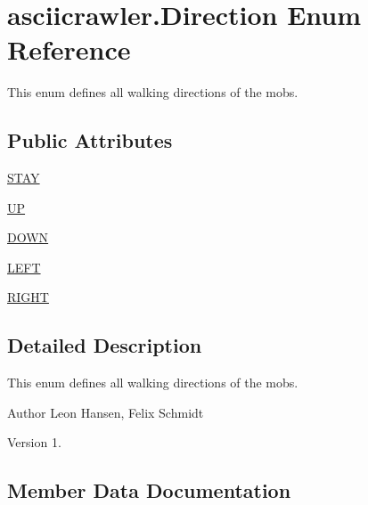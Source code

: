 \hypertarget{enumasciicrawler_1_1Direction}{}\section{asciicrawler.\+Direction Enum Reference}
\label{enumasciicrawler_1_1Direction}


This enum defines all walking directions of the mobs.  


\subsection*{Public Attributes}
\begin{DoxyCompactItemize}
\item 
\hyperlink{enumasciicrawler_1_1Direction_a78902531c0af93fb05af7223491a4a1f}{S\+T\+AY}
\item 
\hyperlink{enumasciicrawler_1_1Direction_a6ddc24b03c5e790038cb48cf48ed8bb0}{UP}
\item 
\hyperlink{enumasciicrawler_1_1Direction_a90041664b85b23fec81f4cc7c5727382}{D\+O\+WN}
\item 
\hyperlink{enumasciicrawler_1_1Direction_a5bf2dba07f51db27f05c357baf2e1ff1}{L\+E\+FT}
\item 
\hyperlink{enumasciicrawler_1_1Direction_a2d6a7c41a905e8eda907cd59e9c80a55}{R\+I\+G\+HT}
\end{DoxyCompactItemize}


\subsection{Detailed Description}
This enum defines all walking directions of the mobs. 

\begin{DoxyAuthor}{Author}
Leon Hansen, Felix Schmidt 
\end{DoxyAuthor}
\begin{DoxyVersion}{Version}
1. 
\end{DoxyVersion}


\subsection{Member Data Documentation}
\mbox{\label{enumasciicrawler_1_1Direction_a90041664b85b23fec81f4cc7c5727382}} 
